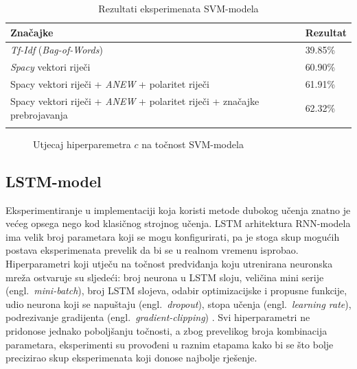 \documentclass[times, utf8, zavrsni]{fer}
\begin{document}
\begin{table}[h]
\centering
\begin{tabular}{|l|l|} 
\hline
\small{Značajke}  &\small{Rezultat}       \\ 
\hline
\small{\emph{Tf-Idf} (\emph{Bag-of-Words})}& 39.85\% \\ 
\hline
\small{\emph{Spacy} vektori riječi}  & 60.90\%  \\ 
\hline
\small{{Spacy} vektori riječi + \emph{ANEW} + polaritet riječi}  & 61.91\%   \\ 
\hline
\small{{Spacy} vektori riječi + \emph{ANEW} + polaritet riječi + značajke prebrojavanja}  & 62.32\%   \\ 
\hline
\multicolumn{1}{l}{}  & \multicolumn{1}{l}{} 
\end{tabular}
\caption{Rezultati eksperimenata \gls{SVM}-modela}
\label{tablesvm}
\end{table}

\begin{figure}
\centering
{}
\caption{Utjecaj hiperparemetra $c$ na točnost SVM-modela}
\label{tablec}
\end{figure}

\subsection{\gls{LSTM}-model}

Eksperimentiranje u implementaciji koja koristi metode dubokog učenja znatno je većeg opsega nego kod klasičnog strojnog učenja. \gls{LSTM} arhitektura \gls{RNN}-modela ima velik broj parametara koji se mogu konfigurirati, pa je stoga skup mogućih postava eksperimenata prevelik da bi se u realnom vremenu isprobao. Hiperparametri koji utječu na točnost predviđanja koju utrenirana neuronska mreža ostvaruje su sljedeći: broj neurona u \gls{LSTM} sloju, veličina mini serije (engl.~\emph{mini-batch}), broj \gls{LSTM} slojeva, odabir optimizacijske i propusne funkcije, udio neurona koji se napuštaju (engl.~\emph{dropout}), stopa učenja (engl.~\emph{learning rate}), podrezivanje gradijenta (engl.~\emph{gradient-clipping}) \citep{parameters}. Svi hiperparametri ne pridonose jednako poboljšanju točnosti, a zbog prevelikog broja kombinacija parametara, eksperimenti su provođeni u raznim etapama kako bi se što bolje precizirao skup eksperimenata koji donose najbolje rješenje. 
\end{document}
